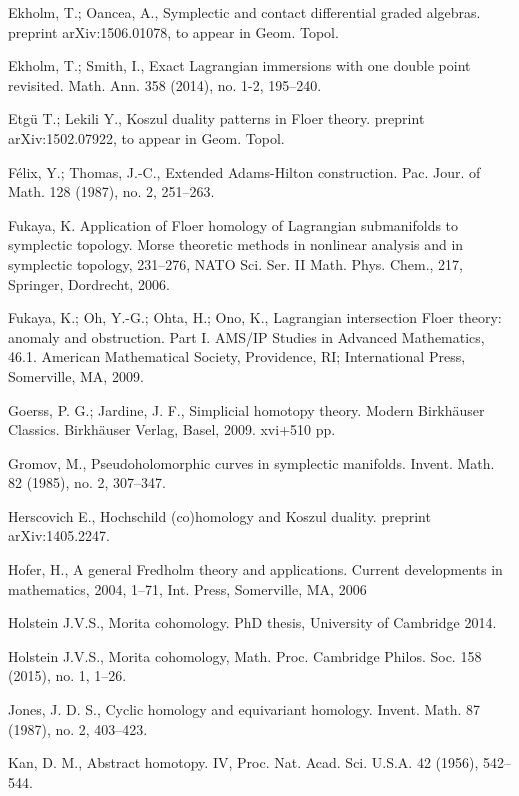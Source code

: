 \documentclass{gtpart}
\begin{document}
\begin{thebibliography}{9999}
 Ekholm, T.; Oancea, A.,  
Symplectic and contact differential graded algebras.
    preprint arXiv:1506.01078, to appear in Geom. Topol. 
	
 Ekholm, T.; Smith, I., Exact Lagrangian immersions with one double point revisited. Math. Ann. 358 (2014), no. 1-2, 195--240.

 Etg\"u T.; Lekili Y., Koszul duality patterns in Floer theory. 
    preprint arXiv:1502.07922, to appear in Geom. Topol. 

 F\'elix, Y.; Thomas, J.-C., Extended Adams-Hilton construction. Pac. Jour. of
    Math. 128 (1987), no. 2, 251--263.

 Fukaya, K. Application of Floer homology of Lagrangian submanifolds to symplectic topology. Morse theoretic methods in nonlinear analysis and in symplectic topology, 231--276, NATO Sci. Ser. II Math. Phys. Chem., 217, Springer, Dordrecht, 2006. 

 Fukaya, K.; Oh, Y.-G.; Ohta, H.; Ono, K., Lagrangian intersection Floer theory: anomaly and obstruction. Part I. AMS/IP Studies in Advanced Mathematics, 46.1. American Mathematical Society, Providence, RI; International Press, Somerville, MA, 2009.      

 Goerss, P. G.; Jardine, J. F., Simplicial homotopy theory. Modern Birkh\"auser
    Classics. Birkh\"auser Verlag, Basel, 2009. xvi+510 pp. 

 Gromov, M., Pseudoholomorphic curves in symplectic manifolds. Invent. Math. 82 (1985), no. 2, 307--347.  

 Herscovich E., Hochschild (co)homology and Koszul duality. preprint arXiv:1405.2247. 

 Hofer, H., A general Fredholm theory and applications. Current developments in mathematics, 2004, 1--71, Int. Press, Somerville, MA, 2006

 Holstein J.V.S., Morita cohomology. PhD thesis, University of Cambridge 2014.

 Holstein J.V.S., Morita cohomology,  Math. Proc. Cambridge Philos. Soc. 158 (2015), no. 1, 1--26. 

  Jones, J. D. S., Cyclic homology and equivariant homology. Invent. Math. 87 (1987), no. 2, 403--423. 

 Kan, D. M., Abstract homotopy. IV, Proc. Nat. Acad. Sci. U.S.A. 42 (1956), 542--544.  


\end{thebibliography}
\end{document}
